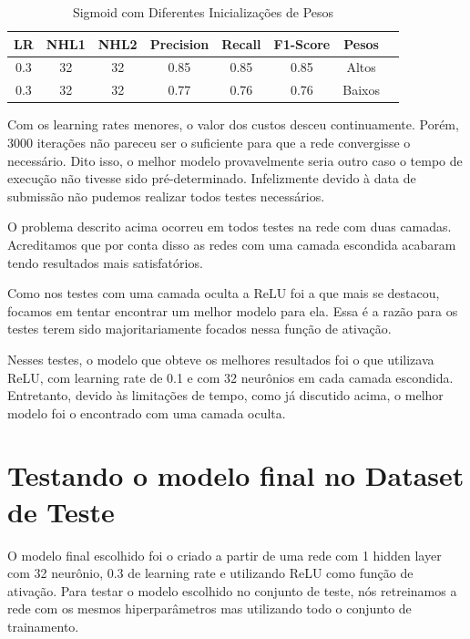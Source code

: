 \documentclass[conference]{IEEEtran}
\begin{document}
\begin{table}[h!]
 \begin{center}
  \caption{Sigmoid com Diferentes Inicializações de Pesos}
  \label{table:table7}
  \begin{tabular}{ |c|c|c|c|c|c|c|c| }
   \hline
   LR & NHL1 & NHL2 & Precision & Recall & F1-Score & Pesos\\
   \hline
   0.3 & 32 & 32 & 0.85 & 0.85 & 0.85 & Altos \\
   0.3 & 32 & 32 & 0.77 & 0.76 & 0.76 & Baixos \\
   \hline
 \end{tabular}
 \end{center}
\end{table}
		
	
	Com os learning rates menores, o valor dos custos desceu continuamente. Porém, 3000 iterações não pareceu ser o suficiente para que a rede convergisse o necessário. Dito isso, o melhor modelo provavelmente seria outro caso o tempo de execução não tivesse sido pré-determinado. Infelizmente devido à data de submissão não pudemos realizar todos testes necessários.
	

	O problema descrito acima ocorreu em todos testes na rede com duas camadas. Acreditamos que por conta disso as redes com uma camada escondida acabaram tendo resultados mais satisfatórios.
	
	Como nos testes com uma camada oculta a ReLU foi a que mais se destacou, focamos em tentar encontrar um melhor modelo para ela. Essa é a razão para os testes terem sido majoritariamente focados nessa função de ativação.


	Nesses testes, o modelo que obteve os melhores resultados foi o que utilizava ReLU, com learning rate de 0.1 e com 32 neurônios em cada camada escondida. Entretanto, devido às limitações de tempo, como já discutido acima, o melhor modelo foi o encontrado com uma camada oculta.
	
\newpage
\section{Testando o modelo final no Dataset de Teste}

	O modelo final escolhido foi o criado a partir de uma rede com 1 hidden layer com 32 neurônio, 0.3 de learning rate e utilizando ReLU como função de ativação.	Para testar o modelo escolhido no conjunto de teste, nós retreinamos a rede com os mesmos hiperparâmetros mas utilizando todo o conjunto de trainamento. 
	
\end{document}
